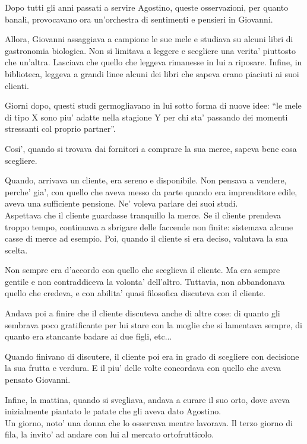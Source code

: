 Dopo tutti gli anni passati a servire Agostino, queste osservazioni, per quanto banali, provocavano ora un'orchestra di sentimenti e pensieri in Giovanni.

Allora, Giovanni assaggiava a campione le sue mele e studiava su alcuni libri di gastronomia biologica. Non si limitava a leggere e scegliere una verita' piuttosto che un'altra. Lasciava che quello che leggeva rimanesse in lui a riposare.
Infine, in biblioteca, leggeva a grandi linee alcuni dei libri che sapeva erano piaciuti ai suoi clienti.

Giorni dopo, questi studi germogliavano in lui sotto forma di nuove idee: ``le mele di tipo X sono piu' adatte nella stagione Y per chi sta' passando dei momenti stressanti col proprio partner''.

Cosi', quando si trovava dai fornitori a comprare la sua merce, sapeva bene cosa scegliere.

Quando, arrivava un cliente, era sereno e disponibile. Non pensava a vendere, perche' gia', con quello che aveva messo da parte quando era imprenditore edile, aveva una sufficiente pensione. Ne' voleva parlare dei suoi studi.\\
Aspettava che il cliente guardasse tranquillo la merce. Se il cliente prendeva troppo tempo, continuava a sbrigare delle faccende non finite: sistemava alcune casse di merce ad esempio. Poi, quando il cliente si era deciso, valutava la sua scelta.

Non sempre era d'accordo con quello che sceglieva il cliente. Ma era sempre gentile e non contraddiceva la volonta' dell'altro. Tuttavia, non abbandonava quello che credeva, e con abilita' quasi filosofica discuteva con il cliente.

Andava poi a finire che il cliente discuteva anche di altre cose: di quanto gli sembrava poco gratificante per lui stare con la moglie che si lamentava sempre, di quanto era stancante badare ai due figli, etc...

Quando finivano di discutere, il cliente poi era in grado di scegliere con decisione la sua frutta e verdura. E il piu' delle volte concordava con quello che aveva pensato Giovanni.

Infine, la mattina, quando si svegliava, andava a curare il suo orto, dove aveva inizialmente piantato le patate che gli aveva dato Agostino.\\

Un giorno, noto' una donna che lo osservava mentre lavorava. Il terzo giorno di fila, la invito' ad andare con lui al mercato ortofrutticolo.

